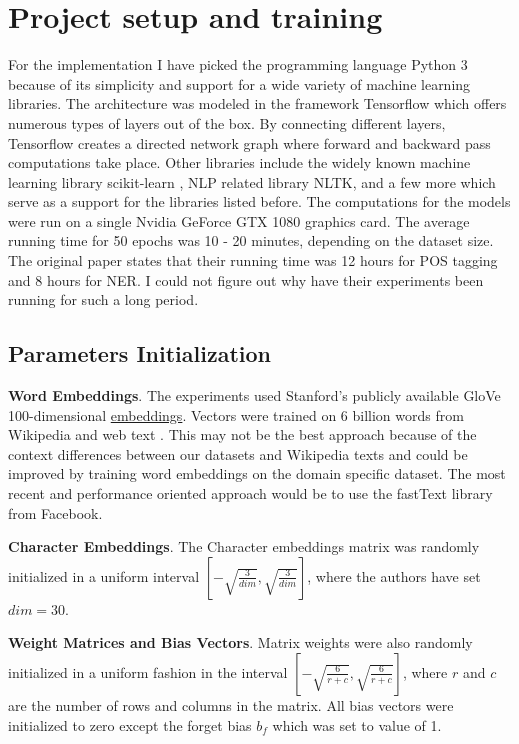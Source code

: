 \section{Project setup and training}
For the implementation I have picked the programming language
Python 3 because of its simplicity and support for a wide variety of
machine learning libraries. The architecture was modeled in the framework
Tensorflow which offers numerous types of layers out of the box. By connecting
different layers, Tensorflow creates a directed network graph where forward
and backward pass computations take place. Other libraries include the widely known
machine learning library scikit-learn \cite{pedregosa2011scikit}, NLP related library
NLTK, and a few more which serve as a support for the libraries
listed before. The computations for the models were run on a single Nvidia GeForce
GTX 1080 graphics card. The average running time for 50 epochs was 10
- 20 minutes, depending on the dataset size. The original paper states that
their running time was 12 hours for POS tagging and 8 hours for NER. I could
not figure out why have their experiments been running for such a long period.

\subsection{Parameters Initialization}
\textbf{Word Embeddings}. The experiments used Stanford's publicly
available GloVe 100-dimensional
\href{http://nlp.stanford.edu/projects/glove/}{embeddings}. Vectors were
trained on 6 billion words from Wikipedia and web text \cite{pennington2014glove}. This may
not be the best approach because of the context differences between our
datasets and Wikipedia texts and could be improved by training word embeddings
on the domain specific dataset. The most recent and performance oriented approach
would be to use the fastText \cite{bojanowski2016enriching} library from
Facebook.

\textbf{Character Embeddings}. The Character embeddings matrix was randomly initialized
in a uniform interval $\left[-\sqrt{\frac{3}{dim}},
\sqrt{\frac{3}{dim}}\right]$, where the authors have set $dim = 30$.

\textbf{Weight Matrices and Bias Vectors}. Matrix weights were also randomly
initialized in a uniform fashion in the interval $\left[-\sqrt{\frac{6}{r+c}},
\sqrt{\frac{6}{r+c}}\right]$, where $r$ and $c$ are the number of rows and
columns in the matrix. All bias vectors were initialized
to zero except the forget bias $b_f$ which was set to value of 1.

